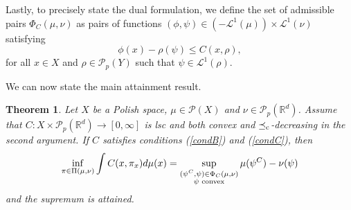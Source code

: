 \documentclass[reqno, a4paper]{amsart}
\newcommand{\lc}{\preceq_{\textnormal{c}}}
\newtheorem{theorem}{Theorem}[section]
\newcommand{\PP}{\mathcal{P}}
\newcommand{\cP}{\mathcal{P}}
\renewcommand{\P}{\cP}
\newcommand{\R}{\mathbb R}
\theoremstyle{definition}
\theoremstyle{definition}
\theoremstyle{definition}
\begin{document}
Lastly, to precisely state the dual formulation, we define the set of admissible pairs $\Phi_C(\mu,\nu)$ as pairs of functions $(\phi,\psi)\in (-\mathcal L^1(\mu))\times \mathcal L^1 (\nu)$ satisfying 
$$\phi(x)-\rho(\psi)\leq C(x,\rho), $$
for all $x\in X$ and $\rho\in\P_p(Y)$ such that $\psi\in \mathcal L^1(\rho)$.

We can now state the main attainment result. 

\begin{theorem} \label{thmatt}
    Let $X$ be a Polish space, $\mu\in\PP(X)$ and $\nu\in\PP_p(\R^d)$. Assume that $C:X\times\PP_p(\R^d)\to[0,\infty]$ is lsc and both convex and  $\lc$-decreasing in the second argument.  If $C$ satisfies conditions (\ref{condB}) and (\ref{condC}), then
   \begin{equation}
        \inf_{\pi\in\Pi(\mu,\nu)}\int C(x,\pi_x)d\mu(x)=\sup_{\substack{(\psi^C,\psi)\in\Phi_C(\mu,\nu) \\ \psi \textnormal{ convex}}} \mu(\psi^C)-\nu(\psi) \label{att_eq}
   \end{equation}
and the supremum is attained. 
\end{theorem}
\end{document}
